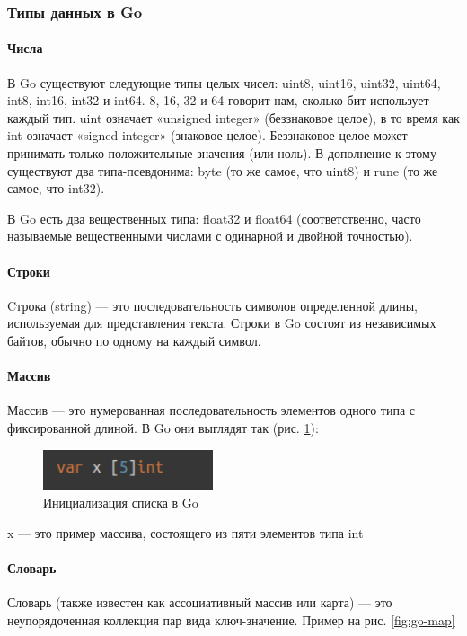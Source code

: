 \subsubsection{Типы данных в Go}

\paragraph{Числа}
В Go существуют следующие типы целых чисел: uint8, uint16, uint32, uint64, int8, int16, int32 и int64. 8, 16, 32 и 64 говорит нам, сколько бит использует каждый тип. uint означает «unsigned integer» (беззнаковое целое), в то время как int означает «signed integer» (знаковое целое). Беззнаковое целое может принимать только положительные значения (или ноль). В дополнение к этому существуют два типа-псевдонима: byte (то же самое, что uint8) и rune (то же самое, что int32).
\par 
В Go есть два вещественных типа: float32 и float64 (соответственно, часто называемые вещественными числами с одинарной и двойной точностью).
\paragraph{Строки} 
Cтрока (string) — это последовательность символов определенной длины, используемая для представления текста. Строки в Go состоят из независимых байтов, обычно по одному на каждый символ.
\paragraph{Массив} 
Массив — это нумерованная последовательность элементов одного типа с фиксированной длиной. В Go они выглядят так (рис. \ref{fig:go-slice}):

\begin{figure}[!ht]
\centering
\includegraphics[width=5cm]{Kenenbek/images/go-slice.png}
\caption{Инициализация списка в Go}
\label{fig:go-slice}
\end{figure}

x — это пример массива, состоящего из пяти элементов типа int
\paragraph{Словарь} 
Словарь (также известен как ассоциативный массив или карта) — это неупорядоченная коллекция пар вида ключ-значение. Пример на рис. \ref{fig:go-map}

